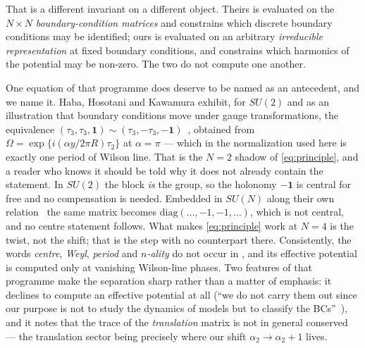 \documentclass[11pt,a4paper]{article}
\begin{document}
That is a different invariant on a different object. Theirs is evaluated on the $N\times N$
\emph{boundary-condition matrices} and constrains which discrete boundary conditions may be
identified; ours is evaluated on an arbitrary \emph{irreducible representation} at fixed
boundary conditions, and constrains which harmonics of the potential may be non-zero. The two
do not compute one another.

One equation of that programme does deserve to be named as an antecedent, and we name it.
Haba, Hosotani and Kawamura exhibit, for $SU(2)$ and as an illustration that boundary
conditions move under gauge transformations, the equivalence
$(\tau_3,\tau_3,\mathbf{1})\sim(\tau_3,-\tau_3,-\mathbf{1})$~\cite[Eq.~(2.20)]{HHK},
obtained from $\Omega=\exp\{i(\alpha y/2\pi R)\tau_2\}$ at $\alpha=\pi$ --- which in the
normalization used here is exactly one period of Wilson line. That is the $N=2$ shadow of
\eqref{eq:principle}, and a reader who knows it should be told why it does not already
contain the statement. In $SU(2)$ the block \emph{is} the group, so the holonomy $-\mathbf{1}$
is central for free and no compensation is needed. Embedded in $SU(N)$ along their own
relation~\cite[Eq.~(2.21)]{HHK} the same matrix becomes $\mathrm{diag}(\dots,-1,-1,\dots)$,
which is not central, and no centre statement follows. What makes \eqref{eq:principle} work at
$N=4$ is the twist, not the shift; that is the step with no counterpart there. Consistently,
the words \emph{centre}, \emph{Weyl}, \emph{period} and \emph{$n$-ality} do not occur in
\cite{HHK}, and its effective potential is computed only at vanishing Wilson-line phases. Two features of that programme make the separation sharp rather
than a matter of emphasis: it declines to compute an effective potential at all
(``we do not carry them out since our purpose is not to study the dynamics of models but to
classify the BCs''~\cite[p.~7]{KawamuraMiura}), and it notes that the trace of the
\emph{translation} matrix is not in general conserved~\cite[fn.~3]{Takeuchi1} --- the
translation sector being precisely where our shift $\alpha_2\to\alpha_2+1$ lives.
\end{document}
